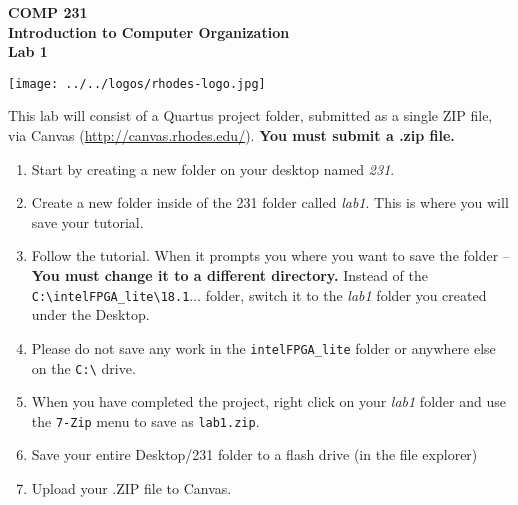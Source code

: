 \documentclass[10pt]{article}
\begin{document}

\hspace{-5mm}
\begin{minipage}{0.65\linewidth}
  \textbf{{\Large COMP 231\\
      Introduction to Computer Organization\\Lab 1}}
\end{minipage}
\begin{minipage}{0.35\linewidth}
  \texttt{[image: ../../logos/rhodes-logo.jpg]}
\end{minipage}

\vspace{.25in}

This lab will consist of a Quartus project folder, submitted as a single ZIP
file, via Canvas (\url{http://canvas.rhodes.edu/}).  {\bf You must submit a
.zip file.} \\

\begin{enumerate}
  \item Start by creating a new folder on your desktop named {\em 231}.

  \item Create a new folder inside of the 231 folder called {\em lab1}. This is where you will save your tutorial.

  \item Follow the tutorial. When it prompts you where you want to save the
    folder -- {\bf You must change it to a different directory.} Instead of the
    {\tt C:\textbackslash intelFPGA\_lite\textbackslash18.1}$\ldots$ folder,
    switch it to the {\em lab1} folder you created under the Desktop.

  \item Please do not save any work in the {\tt intelFPGA\_lite} folder or
    anywhere else on the {\tt C:\textbackslash} drive.

  \item When you have completed the project, right click on your {\em lab1} folder and use the {\tt 7-Zip} menu
    to save as {\tt lab1.zip}.

  \item Save your entire Desktop/231 folder to a flash drive (in the file explorer)

  \item Upload your .ZIP file to Canvas.
\end{enumerate}
\end{document}
